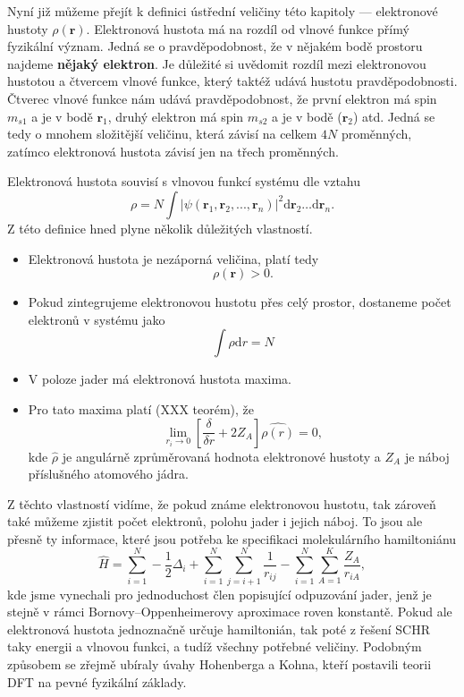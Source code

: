 Nyní již můžeme přejít k definici ústřední veličiny této kapitoly --- elektronové hustoty $\rho(\mathbf{r})$.
Elektronová hustota má na rozdíl od vlnové funkce přímý fyzikální význam. Jedná se o pravděpodobnost, že v nějakém bodě prostoru najdeme \textbf{nějaký elektron}. Je důležité si uvědomit rozdíl mezi elektronovou hustotou a čtvercem vlnové funkce, který taktéž udává hustotu pravděpodobnosti. Čtverec vlnové funkce nám udává pravděpodobnost, že první elektron má spin $m_{s1}$ a je v bodě $\mathbf{r}_1$, druhý elektron má spin $m_{s2}$ a je v bodě ($\mathbf{r}_2$) atd. Jedná se tedy o mnohem složitější veličinu, která závisí na celkem $4N$ proměnných, zatímco elektronová hustota závisí jen na třech proměnných.

Elektronová hustota souvisí s vlnovou funkcí systému dle vztahu
\begin{equation}
\rho=N \int |\psi(\textbf{r}_1,\textbf{r}_2,...,\textbf{r}_n)|^2 \mathrm{d}\textbf{r}_2\dots\mathrm{d}\textbf{r}_n .
\end{equation}
Z této definice hned plyne několik důležitých vlastností.

\begin{itemize}
\item Elektronová hustota je nezáporná veličina, platí tedy
\begin{equation}
\rho(\mathbf{r})  > 0 .
\end{equation}
\item Pokud zintegrujeme elektronovou hustotu přes celý prostor, dostaneme počet elektronů v systému jako
\begin{equation}
\int \rho\mathrm{d}r = N
\end{equation}

\item V poloze jader má elektronová hustota maxima.
\item Pro tato maxima platí (XXX teorém), že
\begin{equation}
\lim_{r_i \to 0} \left[ \frac{\delta}{\delta r}+2Z_A\right]\hat{\rho(r)}=0, 
\end{equation}
kde $\hat{\rho}$ je angulárně zprůměrovaná hodnota elektronové hustoty a $Z_A$ je náboj příslušného atomového jádra.
\end{itemize}

Z těchto vlastností vidíme, že pokud známe elektronovou hustotu, tak zároveň také můžeme zjistit počet elektronů, polohu jader i jejich náboj. To jsou ale přesně ty informace, které jsou potřeba ke specifikaci molekulárního hamiltoniánu
\begin{equation}
\hat{H}=\sum_{i=1}^N -\frac{1}{2}\Delta_i+\sum_{i=1}^N\sum_{j=i+1}^N\frac{1}{r_{ij}}-\sum_{i=1}^N\sum_{A=1}^K \frac{Z_A}{r_{iA}} ,
\label{rov:ham_dft}
\end{equation}
kde jsme vynechali pro jednoduchost člen popisující odpuzování jader, jenž je stejně v rámci Bornovy--Oppenheimerovy aproximace roven konstantě. Pokud ale elektronová hustota jednoznačně určuje hamiltonián, tak poté z řešení SCHR taky energii a vlnovou funkci, a tudíž všechny potřebné veličiny. Podobným způsobem se zřejmě ubíraly úvahy Hohenberga a Kohna, kteří postavili teorii DFT na pevné fyzikální základy.


